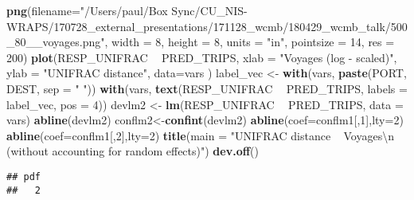 \documentclass[]{article}
\newenvironment{Shaded}{\begin{snugshade}}{\end{snugshade}}
\newcommand{\KeywordTok}[1]{\textcolor[rgb]{0.13,0.29,0.53}{\textbf{#1}}}
\newcommand{\DataTypeTok}[1]{\textcolor[rgb]{0.13,0.29,0.53}{#1}}
\newcommand{\DecValTok}[1]{\textcolor[rgb]{0.00,0.00,0.81}{#1}}
\newcommand{\CharTok}[1]{\textcolor[rgb]{0.31,0.60,0.02}{#1}}
\newcommand{\StringTok}[1]{\textcolor[rgb]{0.31,0.60,0.02}{#1}}
\newcommand{\OperatorTok}[1]{\textcolor[rgb]{0.81,0.36,0.00}{\textbf{#1}}}
\newcommand{\NormalTok}[1]{#1}
\begin{document}
\begin{Shaded}
\begin{Highlighting}[]
\KeywordTok{png}\NormalTok{(}\DataTypeTok{filename=}\StringTok{"/Users/paul/Box Sync/CU_NIS-WRAPS/170728_external_presentations/171128_wcmb/180429_wcmb_talk/500_80__voyages.png"}\NormalTok{,}
    \DataTypeTok{width =} \DecValTok{8}\NormalTok{, }\DataTypeTok{height =} \DecValTok{8}\NormalTok{, }\DataTypeTok{units =} \StringTok{"in"}\NormalTok{, }\DataTypeTok{pointsize =} \DecValTok{14}\NormalTok{, }\DataTypeTok{res =} \DecValTok{200}\NormalTok{)}
\KeywordTok{plot}\NormalTok{(RESP_UNIFRAC }\OperatorTok{~}\StringTok{ }\NormalTok{PRED_TRIPS, }\DataTypeTok{xlab =} \StringTok{"Voyages (log - scaled)"}\NormalTok{, }\DataTypeTok{ylab =} \StringTok{"UNIFRAC distance"}\NormalTok{, }
     \DataTypeTok{data=}\NormalTok{vars )}
\NormalTok{label_vec <-}\StringTok{ }\KeywordTok{with}\NormalTok{(vars, }\KeywordTok{paste}\NormalTok{(PORT, DEST, }\DataTypeTok{sep =} \StringTok{" "}\NormalTok{))}
\KeywordTok{with}\NormalTok{(vars, }\KeywordTok{text}\NormalTok{(RESP_UNIFRAC }\OperatorTok{~}\StringTok{ }\NormalTok{PRED_TRIPS, }\DataTypeTok{labels =}\NormalTok{ label_vec, }\DataTypeTok{pos =} \DecValTok{4}\NormalTok{))}
\NormalTok{devlm2 <-}\StringTok{ }\KeywordTok{lm}\NormalTok{(RESP_UNIFRAC }\OperatorTok{~}\StringTok{ }\NormalTok{PRED_TRIPS, }\DataTypeTok{data =}\NormalTok{ vars)}
\KeywordTok{abline}\NormalTok{(devlm2)}
\NormalTok{conflm2<-}\KeywordTok{confint}\NormalTok{(devlm2)}
\KeywordTok{abline}\NormalTok{(}\DataTypeTok{coef=}\NormalTok{conflm1[,}\DecValTok{1}\NormalTok{],}\DataTypeTok{lty=}\DecValTok{2}\NormalTok{)}
\KeywordTok{abline}\NormalTok{(}\DataTypeTok{coef=}\NormalTok{conflm1[,}\DecValTok{2}\NormalTok{],}\DataTypeTok{lty=}\DecValTok{2}\NormalTok{)}
\KeywordTok{title}\NormalTok{(}\DataTypeTok{main =} \StringTok{"UNIFRAC distance ~ Voyages}\CharTok{\textbackslash{}n}\StringTok{ (without accounting for random effects)"}\NormalTok{)}
\KeywordTok{dev.off}\NormalTok{()}
\end{Highlighting}
\end{Shaded}

\begin{verbatim}
## pdf 
##   2
\end{verbatim}
\end{document}
